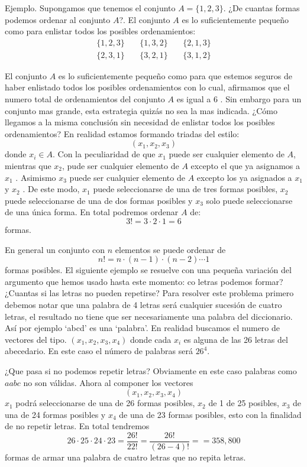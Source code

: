 \documentclass[14pt]{extreport}
\newcounter{ejemplo}[chapter]
\begin{document}
Ejemplo. Supongamos que tenemos el conjunto $A = \{1, 2, 3\}$. ¿De cuantas formas podemos ordenar al conjunto $A$?. El conjunto $A$ es lo suficientemente pequeño como para enlistar todos los posibles ordenamientos:
\begin{align*}
  \{1, 2, 3\} & \  & \{1, 3, 2\} & \  & \{2, 1, 3\} \\
  \{2, 3, 1\} & \  & \{3, 2, 1\} & \  & \{3, 1, 2\}
\end{align*}

El conjunto $A$ es lo suficientemente pequeño como para que estemos seguros de haber enlistado todos los posibles ordenamientos con lo cual, afirmamos que el numero total de ordenamientos del conjunto $A$ es igual a 6 . Sin embargo para un conjunto mas grande, esta estrategia quizás no sea la mas indicada. ¿Cómo llegamos a la misma conclusión sin necesidad de enlistar todos los posibles ordenamientos? En realidad estamos formando triadas del estilo:
$$
  (x_1, x_2, x_3)
$$
donde $x_i \in A$. Con la peculiaridad de que $x_1$ puede ser cualquier elemento de $A$, mientras que $x_2$, pude ser cualquier elemento de $A$ excepto el que ya asignamos a $x_1$ . Asimismo $x_3$ puede ser cualquier elemento de $A$ excepto los ya asignados a $x_1$ y $x_2$ . De este modo, $x_1$ puede seleccionarse de una de tres formas posibles, $x_2$ puede seleccionarse de una de dos formas posibles y $x_3$ solo puede seleccionarse de una única forma. En total podremos ordenar $A$ de:
$$
  3! = 3 \cdot 2 \cdot 1 = 6
$$
formas.

En general un conjunto con $n$ elementos se puede ordenar de
$$n! = n \cdot (n - 1) \cdot (n - 2)\cdots 1
$$
formas posibles.  El siguiente ejemplo se resuelve con una pequeña variación del argumento que hemos usado hasta este momento:
co letras podemos formar? ¿Cuantas si las letras no pueden repetirse? Para resolver este problema primero debemos notar que una palabra de 4 letras será cualquier sucesión de cuatro letras, el resultado no tiene que ser necesariamente una palabra del diccionario. Así por ejemplo `abcd' es una `palabra'. En realidad buscamos el numero de vectores del tipo. $(x_1 , x_2 , x_3 , x_4 )$ donde cada $x_i$ es alguna de las 26 letras del abecedario. En este caso el número de palabras será $26^4$.

¿Que pasa si no podemos repetir letras? Obviamente en este caso palabras como $aabc$ no son válidas. Ahora al componer los vectores
$$
  (x_1, x_2, x_3, x_4)
$$
$x_1$ podrá seleccionarse de una de 26 formas posibles, $x_2$ de 1 de 25 posibles, $x_3$ de una de 24 formas posibles y $x_4$ de una de 23 formas posibles, esto con la finalidad de no repetir letras. En total tendremos
$$
  26 \cdot 25 \cdot 24 \cdot 23 = \frac{26!}{22!} = \frac{26!}{(26 - 4)!} = = 358,800
$$
formas de armar una palabra de cuatro letras que no repita letras.
\end{document}
